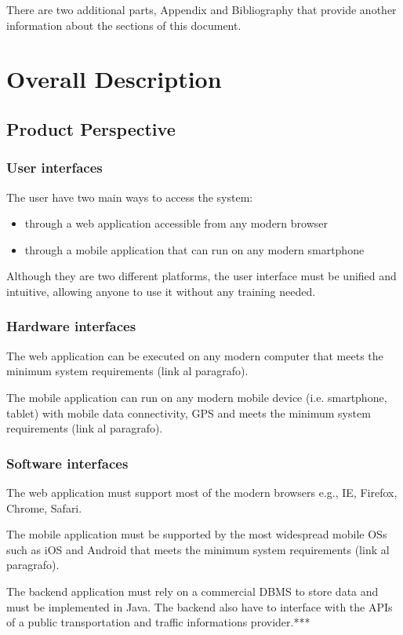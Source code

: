 \documentclass{article}
\begin{document}
	\bigskip
	There are two additional parts, Appendix and Bibliography that provide another information about the sections of this document.
	
	\section{Overall Description}	
	
	
	\subsection{Product Perspective}
	
	
	\subsubsection{User interfaces}
	The user have two main ways to access the system:
	\begin{itemize}
	\item through a web application accessible from any modern browser
	\item through a mobile application that can run on any modern smartphone
	\end{itemize}
	Although they are two different platforms, the user interface must be unified and intuitive, allowing anyone to use it without any training needed.


	\subsubsection{Hardware interfaces}
	The web application can be executed on any modern computer that meets the minimum system requirements (link al paragrafo).
	
	\bigskip
	The mobile application can run on any modern mobile device (i.e. smartphone, tablet) with mobile data connectivity,  GPS and meets the minimum system requirements (link al paragrafo).


	\subsubsection{Software interfaces}
	The web application must support most of the modern browsers e.g., IE, Firefox, Chrome, Safari.
	
	\bigskip
	The mobile application must be supported by the most widespread mobile OSs such as iOS and Android that meets the minimum system requirements (link al paragrafo).

	\bigskip
	The backend application must rely on a commercial DBMS to store data and must be implemented in Java.
	The backend also have to interface with the APIs of a public transportation and  traffic informations provider.***
	
\end{document}
